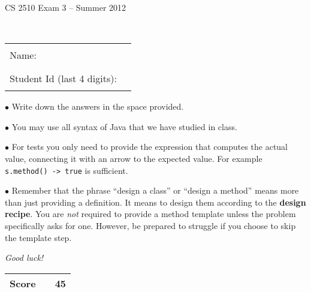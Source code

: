 \documentclass[11pt]{article}
\newcommand\code[1]{\texttt{#1}}
\newcounter{Pctr}
\begin{document}
\renewcommand{\theenumi}{\Alph{enumi}}
\setcounter{Pctr}{0}


\vfill
\centerline{\Large CS 2510 Exam 3 -- Summer 2012}

~\\[2cm]

\begin{center}
\begin{tabular}{l@{\qquad}l}
Name:                        & \rule{200pt}{.1pt} \\[.5cm]
Student Id (last 4 digits):  & \rule{200pt}{.1pt} \\[.5cm]
\end{tabular}
\end{center}

\noindent\begin{minipage}{7.5cm} $\bullet$ Write down the answers in the
space provided. 

$\bullet$ You may use all syntax of Java that we have studied in
class.

$\bullet$ For tests you only need to provide the expression that
computes the actual value, connecting it with an arrow to the expected
value. For example \code{s.method() -> true} is sufficient.

$\bullet$ Remember that the phrase ``design a class'' or ``design a
method'' means more than just providing a definition. It means to
design them according to the \textbf{design recipe}.  You are
\textit{not} required to provide a method template unless the problem
specifically asks for one.  However, be prepared to struggle if you
choose to skip the template step.

\bigskip

\textit{Good luck!}
\end{minipage}\hfil\begin{minipage}[t]{4.5cm}
\begin{tabular}{|c|l@{\qquad\qquad}|r|}
\hline
\textbf{Score} &  & 45 \\ \hline
\end{tabular}
\end{minipage}

\vfill\thispagestyle{empty}
\newpage
\end{document}
